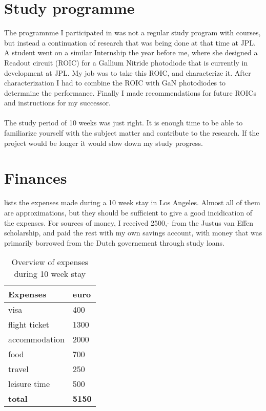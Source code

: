 \documentclass{article}
\begin{document}
\section{Study programme}
The programnme I participated in was not a regular study program with courses, but instead a continuation of research that was being done at that time at JPL. A student went on a similar Internship the year before me, where she designed a Readout circuit (ROIC) for a Gallium Nitride photodiode that is currently in development at JPL. My job was to take this ROIC, and characterize it. After characterization I had to combine the ROIC with GaN photodiodes to determnine the performance. Finally I made recommendations for future ROICs and instructions for my successor.\\
\\
The study period of 10 weeks was just right. It is enough time to be able to familiarize yourself with the subject matter and contribute to the research. If the project would be longer it would slow down my study progress. 

\section{Finances}
 lists the expenses made during a 10 week stay in Los Angeles. Almost all of them are approximations, but they should be sufficient to give a good incidication of the expenses. For sources of money, I received 2500,- from the Justus van Effen scholarship, and paid the rest with my own savings account, with money that was primarily borrowed from the Dutch governement through study loans.

\begin{table}[H]
    \centering
\caption{Overview of expenses during 10 week stay}
\label{my-label}
\begin{tabular}{l|l}
    \textbf{Expenses} & \textbf{euro}\\ \hline
visa              & 400            \\
flight ticket     & 1300           \\
accommodation     & 2000           \\
food              & 700            \\
travel            & 250            \\
leisure time      & 500            \\ \hline
\textbf{total}    & \textbf{5150} 
\end{tabular}
\end{table}
\end{document}
